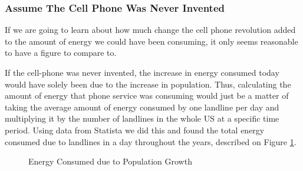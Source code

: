 \documentclass{article}
\begin{document}
\subsubsection{Assume The Cell Phone Was Never Invented}
If we are going to learn about how much change the cell phone revolution added to the amount of energy we could have been consuming, it only seems reasonable to have a figure to compare to. \par 
If the cell-phone was never invented, the increase in energy consumed today would have solely been due to the increase in population. Thus, calculating the amount of energy that phone service was consuming would just be a matter of taking the average amount of energy consumed by one landline per day and multiplying it by the number of landlines in the whole US at a specific time period. Using data from Statista \cite{Households} we did this and found the total energy consumed due to landlines in a day throughout the years, described on Figure \ref{1}.
\\
\begin{figure}
  \caption{Energy Consumed due to Population Growth}
  \label{1}
\end{figure}
\end{document}
